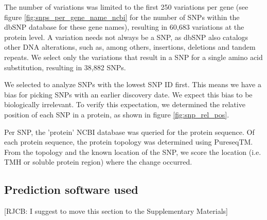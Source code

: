 The number of variations
was limited to the first 250 variations per gene (see figure
\ref{fig:snps_per_gene_name_ncbi} for the number of SNPs
within the dbSNP database for these gene names),
resulting in 60,683 variations at the protein level.
A variation needs not always be a SNP,
as dbSNP also catalogs other DNA alterations, such as, among others, insertions,
deletions and tandem repeats.
We select only the variations that result in a SNP for
a single amino acid substitution, resulting in 38,882 SNPs.

%
We selected to analyze SNPs with the lowest SNP ID first.
This means we have a bias for picking SNPs with
an earlier discovery date.
We expect this bias to be biologically irrelevant.
To verify this expectation, we determined the
relative position of each SNP in a protein,
as shown in figure \ref{fig:snp_rel_pos}.

Per SNP, the 'protein' NCBI database was queried for the
protein sequence.
Of each protein sequence, the protein topology was determined 
using PureseqTM.
From the topology and the known location of the SNP, 
we score the location (i.e. TMH or soluble protein region) 
where the change occurred.

\subsection{Prediction software used}
\label{subsec:prediction_software_used}

[RJCB: I suggest to move this section to the Supplementary Materials]

